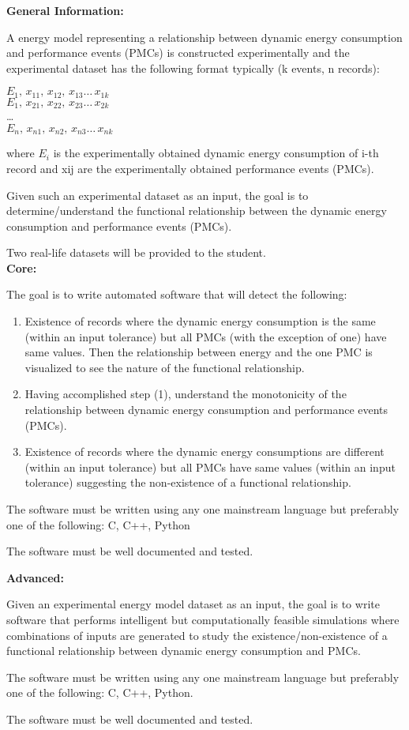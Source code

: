 \textbf{General Information:}

A energy model representing a relationship between dynamic energy consumption and performance events (PMCs) is constructed experimentally and the experimental dataset has the following format typically (k events, n records):

\(E_1,\, x_{11},\, x_{12},\, x_{13} \ldots\, x_{1k}\)\\
\(E_1,\, x_{21},\, x_{22},\, x_{23} \ldots\, x_{2k}\)\\
\ldots \\
\(E_n,\, x_{n1},\, x_{n2},\, x_{n3} \ldots\, x_{nk}\)

where \(E_i\) is the experimentally obtained dynamic energy consumption of i-th record and xij are the experimentally obtained performance events (PMCs).

Given such an experimental dataset as an input, the goal is to determine/understand the functional relationship between the dynamic energy consumption and performance events (PMCs).

Two real-life datasets will be provided to the student.\\
\textbf{Core:}

The goal is to write automated software that will detect the following:
\begin{enumerate}
    \item Existence of records where the dynamic energy consumption is the same (within an input tolerance) but all PMCs (with the exception of one) have same values. Then the relationship between energy and the one PMC is visualized to see the nature of the functional relationship.
    \item Having accomplished step (1), understand the monotonicity of the relationship between dynamic energy consumption and performance events (PMCs).
    \item Existence of records where the dynamic energy consumptions are different (within an input tolerance) but all PMCs have same values (within an input tolerance) suggesting the non-existence of a functional relationship.
\end{enumerate}

The software must be written using any one mainstream language but preferably one of the following:
C, C++, Python

The software must be well documented and tested.

\textbf{Advanced:}

Given an experimental energy model dataset as an input, the goal is to write software that performs intelligent but computationally feasible simulations where combinations of inputs are generated to study the existence/non-existence of a functional relationship between dynamic energy consumption and PMCs.

The software must be written using any one mainstream language but preferably one of the following:
C, C++, Python.

The software must be well documented and tested.
